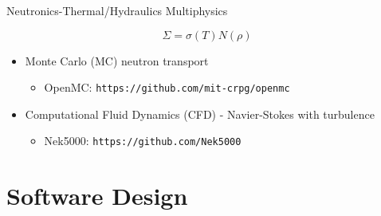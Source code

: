 \documentclass[10pt]{beamer}
\begin{document}
\begin{frame}{Neutronics-Thermal/Hydraulics Multiphysics}

\begin{equation}
\Sigma=\sigma(T) N(\rho)
\end{equation}
\vspace{0.5cm}
\begin{itemize}
\item Monte Carlo (MC) neutron transport
	\begin{itemize}
	\item OpenMC: {\tt https://github.com/mit-crpg/openmc}\newline
	\end{itemize}
\item Computational Fluid Dynamics (CFD) - Navier-Stokes with turbulence
	\begin{itemize}
	\item Nek5000: {\tt https://github.com/Nek5000}
	\end{itemize}
\end{itemize}
\end{frame}

\section{Software Design}
\end{document}
